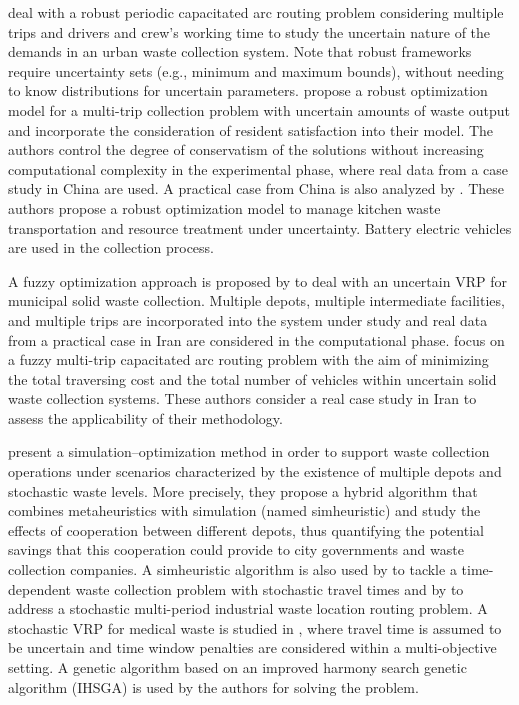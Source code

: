 \documentclass[authoryear,preprint,12pt]{elsarticle}
\begin{document}
\cite{Tirkolaee2018} deal with a robust periodic capacitated arc routing problem considering multiple trips and drivers and crew’s working time to study the uncertain nature of the demands in an urban waste
collection system. Note that robust frameworks require uncertainty sets (e.g., minimum and maximum bounds), without needing to know distributions for uncertain parameters. \cite{Zhang2022} propose a robust optimization model for a multi-trip collection problem with
uncertain amounts of waste output and incorporate the consideration of resident satisfaction into their model. The authors control the degree of conservatism of the solutions without increasing computational complexity in the experimental phase, where real data from a case study in China are used.  A practical case from China is also analyzed by \cite{Shi2024}. These authors propose a robust optimization model to manage kitchen waste transportation and resource treatment under uncertainty. Battery electric vehicles are used in the collection process.

A fuzzy optimization approach is proposed by \cite{Aliahmadi2020} to deal with an uncertain VRP for municipal solid waste collection. Multiple depots, multiple intermediate facilities, and multiple trips are incorporated into the system under study and real data from a practical case in Iran are considered in the computational phase. \cite{Tirkolaee2020} focus on a fuzzy multi-trip capacitated arc routing problem with the aim of minimizing the total traversing cost and the total number of vehicles within uncertain solid waste collection systems. These authors consider a real case study in Iran to assess the applicability of their methodology.

\cite{Gruler2017} present a simulation–optimization method in order to support waste collection operations under scenarios characterized by the existence of multiple depots and stochastic waste levels. More precisely, they propose a hybrid algorithm that combines metaheuristics with simulation (named simheuristic) and study the effects of cooperation between different depots, thus quantifying the potential savings that this cooperation could provide to city governments and waste collection companies. A simheuristic algorithm is also used by \cite{Gruler2020} to tackle a time-dependent
waste collection problem with stochastic travel times and by \cite{Rabbani2019} to address a stochastic multi-period industrial waste location routing problem. A stochastic VRP for medical waste is studied in \cite{Xu2025}, where travel time is assumed to be uncertain and time window penalties are considered within a multi-objective setting. A genetic algorithm based on an improved harmony search genetic algorithm (IHSGA) is used by the authors for solving the problem.
\end{document}
